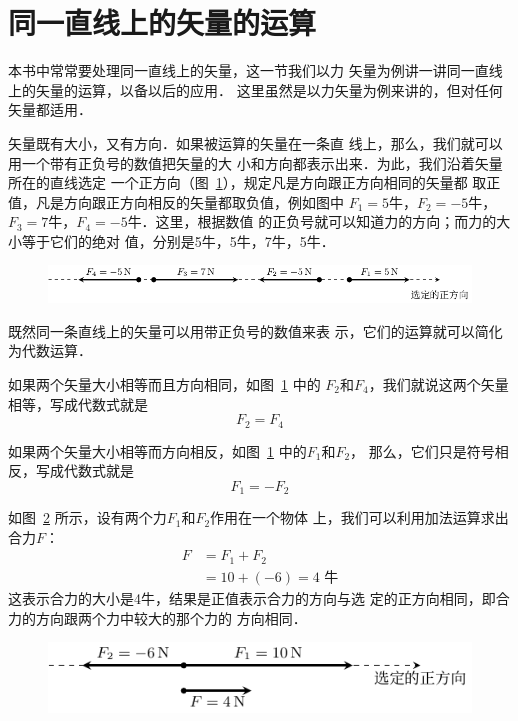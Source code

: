 \section{同一直线上的矢量的运算} 
    本书中常常要处理同一直线上的矢量，这一节我们以力
矢量为例讲一讲同一直线上的矢量的运算，以备以后的应用．
这里虽然是以力矢量为例来讲的，但对任何矢量都适用．

    矢量既有大小，又有方向．如果被运算的矢量在一条直
线上，那么，我们就可以用一个带有正负号的数值把矢量的大
小和方向都表示出来．为此，我们沿着矢量所在的直线选定
一个正方向（图~\ref{fig_A_1-33}），规定凡是方向跟正方向相同的矢量都
取正值，凡是方向跟正方向相反的矢量都取负值，例如图中
$F_1=5$牛，$F_2=-5$牛，$F_3=7$牛，$F_4=-5$牛．这里，根据数值
的正负号就可以知道力的方向；而力的大小等于它们的绝对
值，分别是5牛，5牛，7牛，5牛．

\begin{figure}[htbp]
    \centering
    \includegraphics{fig/A/1-33.pdf} 
    \caption{} \label{fig_A_1-33} 
\end{figure} 

既然同一条直线上的矢量可以用带正负号的数值来表
示，它们的运算就可以简化为代数运算．

    如果两个矢量大小相等而且方向相同，如图~\ref{fig_A_1-33} 中的
$F_2$和$F_4$，我们就说这两个矢量相等，写成代数式就是
\begin{equation} 
F_2=F_4
\end{equation} 

    如果两个矢量大小相等而方向相反，如图~\ref{fig_A_1-33} 中的$F_1$和$F_2$，
那么，它们只是符号相反，写成代数式就是
\begin{equation} 
F_1=-F_2
\end{equation} 

    如图~\ref{fig_A_1-34} 所示，设有两个力$F_1$和$F_2$作用在一个物体
上，我们可以利用加法运算求出合力$F$：
\begin{equation}\label{eq-A-1.5}
\begin{split} 
F&=F_1+F_2\\
&=10+(-6)=4\text{ 牛} 
\end{split} 
\end{equation} 
这表示合力的大小是4牛，结果是正值表示合力的方向与选
定的正方向相同，即合力的方向跟两个力中较大的那个力的
方向相同．

\begin{figure}[htbp]
    \centering
    \includegraphics{fig/A/1-34.pdf} 
    \caption{} \label{fig_A_1-34} 
\end{figure} 

